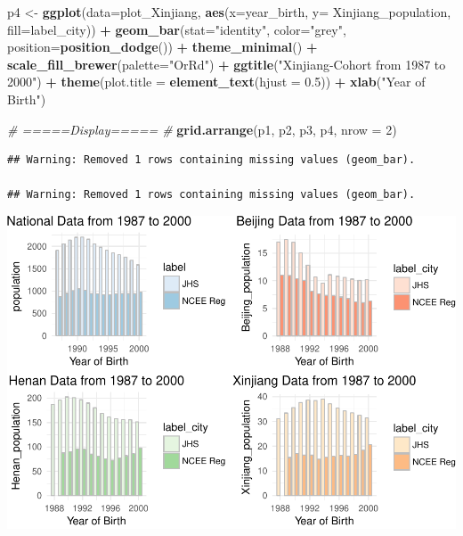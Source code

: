 \documentclass[]{article}
\newenvironment{Shaded}{\begin{snugshade}}{\end{snugshade}}
\newcommand{\KeywordTok}[1]{\textcolor[rgb]{0.13,0.29,0.53}{\textbf{#1}}}
\newcommand{\DataTypeTok}[1]{\textcolor[rgb]{0.13,0.29,0.53}{#1}}
\newcommand{\DecValTok}[1]{\textcolor[rgb]{0.00,0.00,0.81}{#1}}
\newcommand{\FloatTok}[1]{\textcolor[rgb]{0.00,0.00,0.81}{#1}}
\newcommand{\StringTok}[1]{\textcolor[rgb]{0.31,0.60,0.02}{#1}}
\newcommand{\CommentTok}[1]{\textcolor[rgb]{0.56,0.35,0.01}{\textit{#1}}}
\newcommand{\OperatorTok}[1]{\textcolor[rgb]{0.81,0.36,0.00}{\textbf{#1}}}
\newcommand{\NormalTok}[1]{#1}
\begin{document}
\begin{Shaded}
\begin{Highlighting}[]
\NormalTok{p4 <-}\StringTok{ }\KeywordTok{ggplot}\NormalTok{(}\DataTypeTok{data=}\NormalTok{plot_Xinjiang, }\KeywordTok{aes}\NormalTok{(}\DataTypeTok{x=}\NormalTok{year_birth, }\DataTypeTok{y=}\NormalTok{ Xinjiang_population, }\DataTypeTok{fill=}\NormalTok{label_city)) }\OperatorTok{+}
\KeywordTok{geom_bar}\NormalTok{(}\DataTypeTok{stat=}\StringTok{"identity"}\NormalTok{, }\DataTypeTok{color=}\StringTok{"grey"}\NormalTok{, }\DataTypeTok{position=}\KeywordTok{position_dodge}\NormalTok{()) }\OperatorTok{+}
\StringTok{  }\KeywordTok{theme_minimal}\NormalTok{() }\OperatorTok{+}
\StringTok{  }\KeywordTok{scale_fill_brewer}\NormalTok{(}\DataTypeTok{palette=}\StringTok{"OrRd"}\NormalTok{) }\OperatorTok{+}
\StringTok{  }\KeywordTok{ggtitle}\NormalTok{(}\StringTok{"Xinjiang-Cohort from 1987 to 2000"}\NormalTok{) }\OperatorTok{+}
\StringTok{  }\KeywordTok{theme}\NormalTok{(}\DataTypeTok{plot.title =} \KeywordTok{element_text}\NormalTok{(}\DataTypeTok{hjust =} \FloatTok{0.5}\NormalTok{)) }\OperatorTok{+}
\StringTok{  }\KeywordTok{xlab}\NormalTok{(}\StringTok{"Year of Birth"}\NormalTok{)}

\CommentTok{# =====Display===== #}
\KeywordTok{grid.arrange}\NormalTok{(p1, p2, p3, p4, }\DataTypeTok{nrow =} \DecValTok{2}\NormalTok{)}
\end{Highlighting}
\end{Shaded}

\begin{verbatim}
## Warning: Removed 1 rows containing missing values (geom_bar).

## Warning: Removed 1 rows containing missing values (geom_bar).
\end{verbatim}

\includegraphics{NCEE_files/figure-latex/unnamed-chunk-3-1.pdf}
\end{document}
